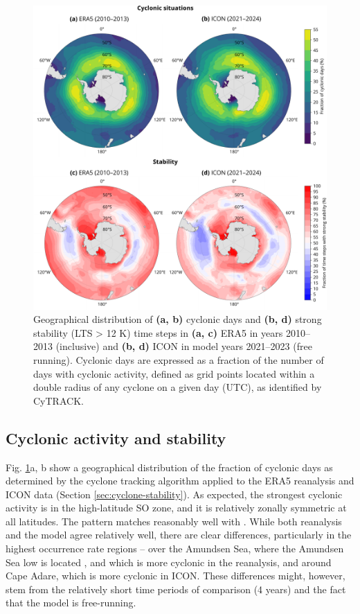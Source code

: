 \documentclass[draft]{agujournal2019}
\begin{document}
\begin{figure}[p!]
\centering
\includegraphics[width=\textwidth]{img/cyc_stab_dist.pdf}
\caption{
Geographical distribution of \textbf{(a, b)} cyclonic days and \textbf{(b, d)} strong stability (LTS > 12 K) time steps in \textbf{(a, c)} ERA5 in years 2010--2013 (inclusive) and \textbf{(b, d)} ICON in model years 2021--2023 (free running). Cyclonic days are expressed as a fraction of the number of days with cyclonic activity, defined as grid points located within a double radius of any cyclone on a given day (UTC), as identified by CyTRACK.
}
\label{fig:cyclone-stability}
\end{figure}

\subsection{Cyclonic activity and stability}

Fig. \ref{fig:cyclone-stability}a, b show a geographical distribution of the fraction of cyclonic days as determined by the cyclone tracking algorithm applied to the ERA5 reanalysis and ICON data (Section \ref{sec:cyclone-stability}). As expected, the strongest cyclonic activity is in the high-latitude SO zone, and it is relatively zonally symmetric at all latitudes. The pattern matches reasonably well with . While both reanalysis and the model agree relatively well, there are clear differences, particularly in the highest occurrence rate regions -- over the Amundsen Sea, where the Amundsen Sea low is located , and which is more cyclonic in the reanalysis, and around Cape Adare, which is more cyclonic in ICON. These differences might, however, stem from the relatively short time periods of comparison (4 years) and the fact that the model is free-running.
\end{document}
